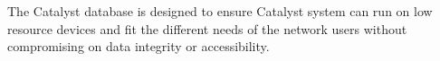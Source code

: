 The Catalyst database is designed to ensure Catalyst system can run on low resource devices and fit the different needs of the network users without compromising on data integrity or accessibility. 